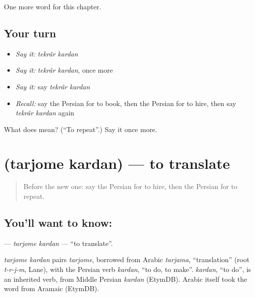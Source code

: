 \begin{grammarlens}[title={What you've built}]
One more word for this chapter.
\end{grammarlens}

\subsection*{Your turn}
\begin{itemize}
\raggedright
  \item \emph{Say it:} \emph{tekrâr kardan}
  \item \emph{Say it:} \emph{tekrâr kardan}, once more
  \item \emph{Say it:} say \emph{tekrâr kardan}
  \item \emph{Recall:} say the Persian for to book, then the Persian for to hire, then say \emph{tekrâr kardan} again
\end{itemize}

\begin{tcolorbox}[breakable,colback=teal!4,colframe=teal!35!black,title={Before you move on}]
What does   mean? (\textquotedblleft{}To repeat\textquotedblright{}.) Say it once more.
\end{tcolorbox}
\section[\texorpdfstring{\fa{ترجمه} \fa{کردن} (tarjome kardan)}{ترجمه کردن (tarjome kardan)}]{  (tarjome kardan) — to translate}

\label{lesson:FA-C182-tarjome-kardan}



\begin{quote}
Before the new one: say the Persian for to hire, then the Persian for to repeat.
\end{quote}

\subsection*{You'll want to know:  }
\textbf{ } — \emph{tarjome kardan} — \textquotedblleft{}to translate\textquotedblright{}.

\begin{cousinweb}
\emph{tarjome kardan} pairs \emph{tarjome}, borrowed from Arabic \emph{tarjama}, \textquotedblleft{}translation\textquotedblright{} (root \emph{t-r-j-m}, Lane), with the Persian verb \emph{kardan}, \textquotedblleft{}to do, to make\textquotedblright{}. \emph{kardan}, \textquotedblleft{}to do\textquotedblright{}, is an inherited verb, from Middle Persian \emph{kardan} (EtymDB). Arabic itself took the word from Aramaic (EtymDB).
\end{cousinweb}

